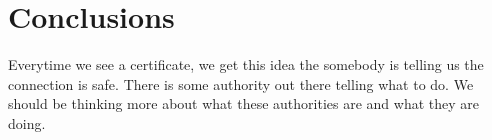 \chapter{Conclusions}
\noindent
Everytime we see a certificate, we get this idea the somebody is telling us the
connection is safe. There is some authority out there telling what to do.
We should be thinking more about what these authorities are and what they are
doing.

